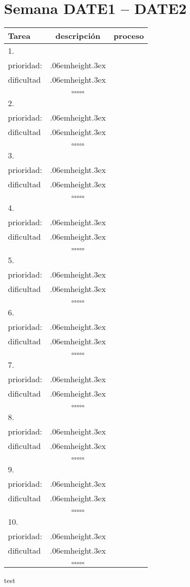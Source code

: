 \documentclass[a4paper,12pt]{scrartcl}
\newcommand\Vtextvisiblespace[1][.3em]{%
  \mbox{\kern.06em\vrule height.3ex}%
  \vbox{\hrule width#1}%
  \hbox{\vrule height.3ex}}
\newcommand{\subtablaDescrip}{ \begin{tabular}{ll}&\\ prioridad: & \Vtextvisiblespace[2em] \\ dificultad & \Vtextvisiblespace[2em]\\&\\ \end{tabular}}
\begin{document}
    \section*{Semana DATE1 -- DATE2}
    \thispagestyle{empty}
    \noindent
    \begin{tabularx}{\linewidth}{|X|c c|}
        \hline
      \textbf{Tarea} & \textbf{descripción} & \textbf{proceso}\\
      \hline
       1.\vspace{4ex} &      \subtablaDescrip     & $\square\square\square\square\square$ \\
      \hline
      2.\vspace{4ex} &      \subtablaDescrip     & $\square\square\square\square\square$ \\
      \hline
      3.\vspace{4ex} &      \subtablaDescrip     & $\square\square\square\square\square$ \\
      \hline
      4.\vspace{4ex} &      \subtablaDescrip     & $\square\square\square\square\square$ \\
      \hline
      5.\vspace{4ex} &      \subtablaDescrip     & $\square\square\square\square\square$ \\
      \hline
      6.\vspace{4ex} &      \subtablaDescrip     & $\square\square\square\square\square$ \\
      \hline
      7.\vspace{4ex} &      \subtablaDescrip     & $\square\square\square\square\square$ \\
      \hline
      8.\vspace{4ex} &      \subtablaDescrip     & $\square\square\square\square\square$ \\
      \hline
      9.\vspace{4ex} &      \subtablaDescrip     & $\square\square\square\square\square$ \\
      \hline
      10.\vspace{4ex} &      \subtablaDescrip     & $\square\square\square\square\square$ \\
      \hline
    \end{tabularx}

    \newpage
test\\

\framebox[40ex]{\rule{0pt}{5ex}}
\end{document}
